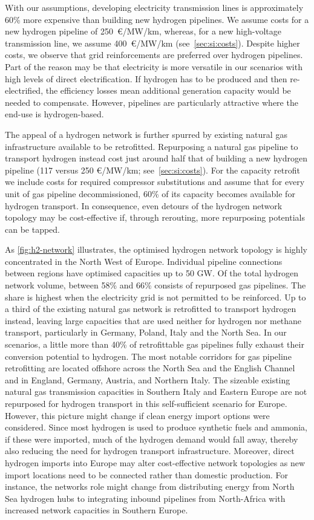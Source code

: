 With our assumptions, developing electricity transmission lines is approximately
60\% more expensive than building new hydrogen pipelines. We assume costs for a
new hydrogen pipeline of 250~\euro/MW/km, whereas, for a new
high-voltage transmission line, we assume 400~\euro/MW/km (see~\cref{sec:si:costs}). Despite
higher costs, we observe that grid reinforcements are preferred over hydrogen
pipelines. Part of the reason may be that electricity is more versatile in our
scenarios with high levels of direct electrification. If hydrogen has to be
produced and then re-electrified, the efficiency losses mean additional generation
capacity would be needed to compensate. However, pipelines are particularly
attractive where the end-use is hydrogen-based.

The appeal of a hydrogen network is further spurred by existing natural gas
infrastructure available to be retrofitted. Repurposing a natural gas pipeline
to transport hydrogen instead cost just around half that of building a new
hydrogen pipeline (117 versus 250 \euro/MW/km; see~\cref{sec:si:costs}). For the
capacity retrofit we include costs for required compressor substitutions and
assume that for every unit of gas pipeline decommissioned, 60\% of its capacity
becomes available for hydrogen transport. In consequence, even detours of the
hydrogen network topology may be cost-effective if, through rerouting, more
repurposing potentials can be tapped.

As \cref{fig:h2-network} illustrates, the optimised hydrogen network topology is
highly concentrated in the North West of Europe. Individual pipeline connections
between regions have optimised capacities up to 50 GW. Of the total hydrogen
network volume, between 58\% and 66\% consists of repurposed gas pipelines. The
share is highest when the electricity grid is not permitted to be reinforced. Up
to a third of the existing natural gas network is retrofitted to transport hydrogen
instead, leaving large capacities that are used neither for hydrogen nor methane
transport, particularly in Germany, Poland, Italy and the North Sea. In our
scenarios, a little more than 40\% of retrofittable gas pipelines fully exhaust
their conversion potential to hydrogen. The most notable corridors for gas
pipeline retrofitting are located offshore across the North Sea and the English
Channel and in England, Germany, Austria, and Northern Italy. The sizeable
existing natural gas transmission capacities in Southern Italy and Eastern Europe are
not repurposed for hydrogen transport in this self-sufficient scenario for
Europe. However, this picture might change if clean energy import options were
considered. Since most hydrogen is used to produce synthetic fuels and ammonia,
if these were imported, much of the hydrogen demand would fall away, thereby
also reducing the need for hydrogen transport infrastructure. Moreover, direct
hydrogen imports into Europe may alter cost-effective network topologies as new
import locations need to be connected rather than domestic production. For
instance, the networks role might change from distributing energy from North Sea
hydrogen hubs to integrating inbound pipelines from North-Africa with increased
network capacities in Southern Europe.

